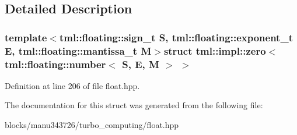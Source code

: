 \subsection{Detailed Description}
\subsubsection*{template$<$tml\+::floating\+::sign\+\_\+t S, tml\+::floating\+::exponent\+\_\+t E, tml\+::floating\+::mantissa\+\_\+t M$>$struct tml\+::impl\+::zero$<$ tml\+::floating\+::number$<$ S, E, M $>$ $>$}



Definition at line 206 of file float.\+hpp.



The documentation for this struct was generated from the following file\+:\begin{DoxyCompactItemize}
\item 
blocks/manu343726/turbo\+\_\+computing/float.\+hpp\end{DoxyCompactItemize}
